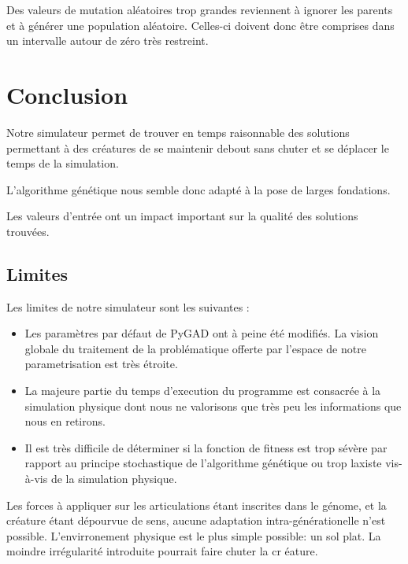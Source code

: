 \documentclass[journal, a4paper]{IEEEtran}
\begin{document}
	Des valeurs de mutation aléatoires trop grandes reviennent à
	ignorer les parents et à générer une population aléatoire.
	Celles-ci doivent donc être comprises dans un
	intervalle autour de zéro très restreint.

\section{Conclusion}\label{sec:conclusion}
	Notre simulateur permet de trouver en temps raisonnable des
	solutions permettant à des créatures de se maintenir debout sans
	chuter et	se déplacer le temps de la simulation.



	L'algorithme génétique nous semble donc adapté à la pose de
	larges fondations.



	Les valeurs d'entrée ont un impact important sur la qualité
	des solutions trouvées.

\subsection{Limites}\label{subsec:limites}
	Les limites de notre simulateur sont les suivantes :
	\begin{itemize}
		\item Les paramètres par défaut de PyGAD ont à peine été
		modifiés. La vision globale du traitement de la problématique
		offerte par l'espace de notre parametrisation est très étroite.
		\item La majeure partie du temps d'execution du programme est
		consacrée à la simulation physique dont nous ne valorisons que
		très peu les informations que nous en retirons.
		\item Il est très difficile de déterminer si la fonction de
		fitness
		est trop sévère par rapport au principe stochastique de l'algorithme
		génétique ou trop laxiste vis-à-vis de la simulation physique.
	\end{itemize}
	Les forces à appliquer sur les articulations étant inscrites dans
	le génome, et la créature étant dépourvue de sens, aucune adaptation
	intra-générationelle n'est possible.
	L'envirronement physique est le plus simple possible: un sol plat.
	La moindre irrégularité introduite pourrait faire chuter la cr
	éature.


\end{document}
